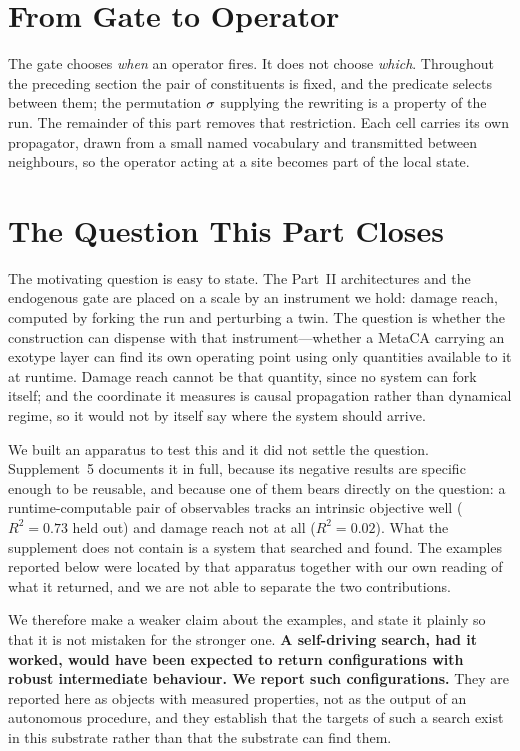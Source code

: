 \section{From Gate to Operator}
\label{sec:exotype-intro}

The gate chooses \emph{when} an operator fires. It does not choose \emph{which}.
Throughout the preceding section the pair of constituents is fixed, and the
predicate selects between them; the permutation $\sigma$ supplying the rewriting is
a property of the run. The remainder of this part removes that restriction. Each
cell carries its own propagator, drawn from a small named vocabulary and
transmitted between neighbours, so the operator acting at a site becomes part of
the local state.

\section{The Question This Part Closes}
\label{sec:exotype-question}

The motivating question is easy to state. The Part~II architectures and the endogenous gate are placed on
a scale by an instrument we hold: damage reach, computed by forking the run and
perturbing a twin. The question is whether the construction can dispense with that
instrument---whether a MetaCA carrying an exotype layer can find its own operating
point using only quantities available to it at runtime. Damage reach cannot be that
quantity, since no system can fork itself; and the coordinate it measures is causal
propagation rather than dynamical regime, so it would not by itself say where the
system should arrive.

We built an apparatus to test this and it did not settle the question.
Supplement~5 documents it in full, because its negative results are specific enough to
be reusable, and because one of them bears directly on the question: a runtime-computable
pair of observables tracks an intrinsic objective well ($R^2 = 0.73$ held out) and damage
reach not at all ($R^2 = 0.02$). What the supplement does not contain is a system that
searched and found. The examples reported below were located by that apparatus together
with our own reading of what it returned, and we are not able to separate the two
contributions.

We therefore make a weaker claim about the examples, and state it plainly so
that it is not mistaken for the stronger one. \textbf{A self-driving search,
had it worked, would have been expected to return configurations with robust
intermediate behaviour. We report such configurations.} They are reported here
as objects with measured properties, not as the output of an autonomous
procedure, and they establish that the targets of such a search exist in this
substrate rather than that the substrate can find them.

